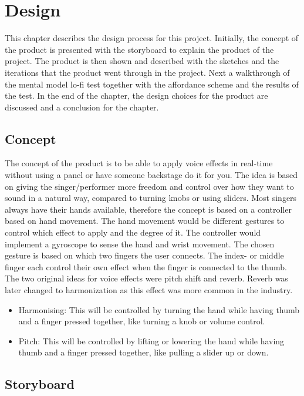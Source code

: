\chapter{Design}

This chapter describes the design process for this project. Initially, the concept of the product is presented with the storyboard to explain the product of the project. The product is then shown and described with the sketches and the iterations that the product went through in the project. Next a walkthrough of the mental model lo-fi test together with the affordance scheme and the results of the test. In the end of the chapter, the design choices for the product are discussed and a conclusion for the chapter.

\section{Concept}
The concept of the product is to be able to apply voice effects in real-time without using a panel or have someone backstage do it for you. The idea is based on giving the singer/performer more freedom and control over how they want to sound in a natural way, compared to turning knobs or using sliders. Most singers always have their hands available, therefore the concept is based on a controller based on hand movement. The hand movement would be different gestures to control which effect to apply and the degree of it.
The controller would implement a gyroscope to sense the hand and wrist movement. The chosen gesture is based on which two fingers the user connects. The index- or middle finger each control their own effect when the finger is connected to the thumb.
The two original ideas for voice effects were pitch shift and reverb. Reverb was later changed to harmonization as this effect was more common in the industry.


\begin{itemize}
\item Harmonising: This will be controlled by turning the hand while having thumb and a finger pressed together, like turning a knob or volume control.
\item Pitch: This will be controlled by lifting or lowering the hand while having thumb and a finger pressed together, like pulling a slider up or down.
\end{itemize}

\section{Storyboard}

